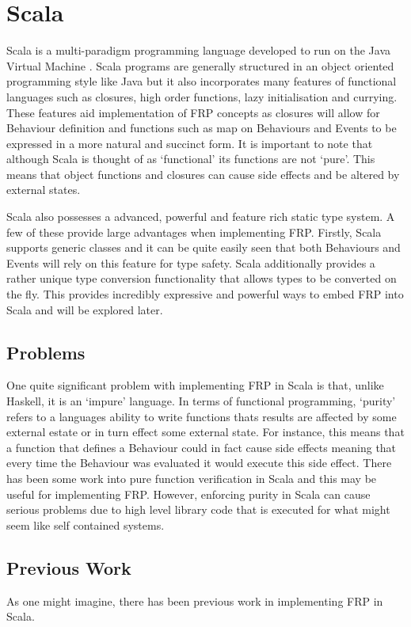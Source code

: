 \chapter{Scala}
  Scala is a multi-paradigm programming language developed to run on the Java Virtual Machine \cite{Odersky2004}. Scala 
  programs are
  generally structured in an object oriented programming style like Java but it also incorporates many features of
  functional languages such as closures, high order functions, lazy initialisation and currying. These features aid
  implementation of FRP concepts as closures will allow for Behaviour definition and functions such as map on
  Behaviours and Events to be expressed in a more natural and succinct form. It is
  important to note that although Scala is thought of as `functional' its functions are not `pure'. This means
  that object functions and closures can cause side effects and be altered by external states.

  Scala also possesses a advanced, powerful and feature rich static type system. A few of these provide large
  advantages when implementing FRP. Firstly, Scala supports generic classes and it can be quite easily seen
  that both Behaviours and Events will rely on this feature for type safety. Scala additionally provides
  a rather unique type conversion functionality that allows types to be converted on the fly. This provides
  incredibly expressive and powerful ways to embed FRP into Scala and will be explored later.
  
  \section{Problems}
    One quite significant problem with implementing FRP in Scala is that, unlike Haskell, it is an `impure'
    language. In terms of functional programming, `purity' refers to a languages ability to write functions
    thats results are affected by some external estate or in turn effect some external state. For instance,
    this means that a function that defines a Behaviour could in fact cause side effects meaning that
    every time the Behaviour was evaluated it would execute this side effect. There has been some work into
    pure function verification in Scala and this may be useful for implementing FRP. However, enforcing
    purity in Scala can cause serious problems due to high level library code that is executed for
    what might seem like self contained systems.
  
  \section{Previous Work}
    As one might imagine, there has been previous work in implementing FRP in Scala. 
    
